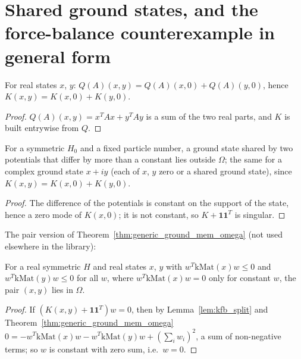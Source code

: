 \section{Shared ground states, and the force-balance counterexample in general form}

\begin{lemma}
  \label{lem:kfb_split}
  \leanok
  For real states $x$, $y$: $Q(A)(x,y)=Q(A)(x,0)+Q(A)(y,0)$, hence $K(x,y)=K(x,0)+K(y,0)$.
\end{lemma}
\begin{proof}
  \leanok
  $Q(A)(x,y)=x^TAx+y^TAy$ is a sum of the two real parts, and $K$ is built entrywise from $Q$.
\end{proof}

\begin{theorem}
  \label{thm:shared_ground_state_not_mem_omega}
  \leanok
  For a symmetric $H_0$ and a fixed particle number, a ground state shared by two potentials that differ by more than a
  constant lies outside $\Omega$; the same for a complex ground state $x+iy$ (each of $x$, $y$ zero or a shared ground
  state), since $K(x,y)=K(x,0)+K(y,0)$.
\end{theorem}
\begin{proof}
  \leanok
  The difference of the potentials is constant on the support of the state, hence a zero mode of $K(x,0)$; it is not
  constant, so $K+\mathbf 1\mathbf 1^T$ is singular.
\end{proof}

The pair version of Theorem~\ref{thm:generic_ground_mem_omega} (not used elsewhere in the library):

\begin{lemma}
  \label{lem:mem_omega_of_definite_pair}
  \leanok
  For a real symmetric $H$ and real states $x$, $y$ with $w^T\mathrm{kMat}(x)w\le0$ and $w^T\mathrm{kMat}(y)w\le0$
  for all $w$, where $w^T\mathrm{kMat}(x)w=0$ only for constant $w$, the pair $(x,y)$ lies in $\Omega$.
\end{lemma}
\begin{proof}
  \leanok
  If $(K(x,y)+\mathbf 1\mathbf 1^T)w=0$, then by Lemma~\ref{lem:kfb_split} and
  Theorem~\ref{thm:generic_ground_mem_omega}
  $0=-w^T\mathrm{kMat}(x)w-w^T\mathrm{kMat}(y)w+(\sum_iw_i)^2$, a sum of non-negative terms; so $w$ is constant with
  zero sum, i.e.\ $w=0$.
\end{proof}

